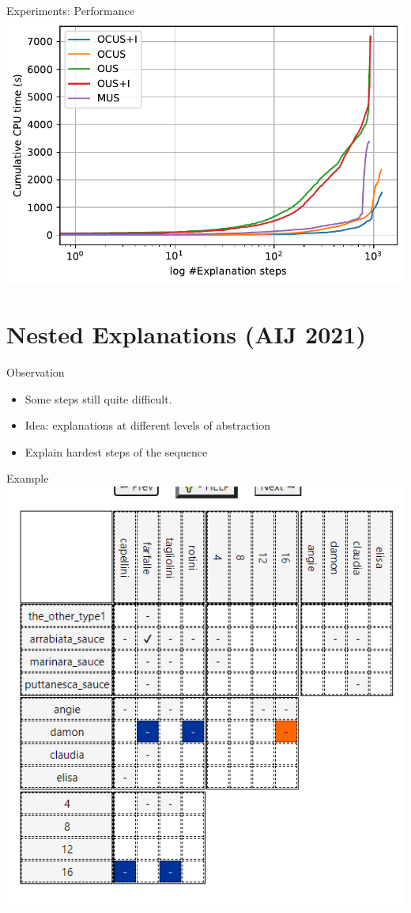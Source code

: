 \documentclass[12pt,aspectratio=169]{beamer}
\begin{document}
\begin{frame}{Experiments: Performance }
  \centering
  \includegraphics[width=0.8\columnwidth]{figures/rq4_b.pdf}

\end{frame}











\section{Nested Explanations (AIJ 2021)}

\begin{frame}{Observation}
 \begin{itemize}
  \item Some steps still quite difficult. 
   \item Idea: explanations at different levels of abstraction
  \item Explain hardest steps of the sequence
 \end{itemize}

\end{frame}

\begin{frame}{Example}
  \centering
  \includegraphics[width=0.4\columnwidth]{figures/difficult.png}
\end{frame}
\end{document}
